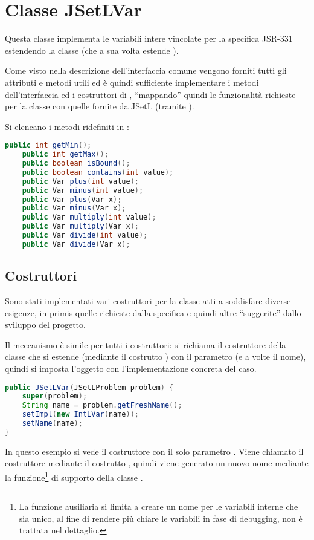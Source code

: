 \section{Classe JSetLVar}
Questa classe implementa le variabili intere vincolate
 per la specifica JSR-331
estendendo la classe  (che a sua volta estende 
).

Come visto nella descrizione dell'interfaccia comune vengono forniti tutti gli
attributi e metodi utili ed è quindi sufficiente implementare i metodi
dell'interfaccia  ed i costruttori di ,
``mappando'' quindi le funzionalità richieste per la classe 
con quelle fornite da JSetL (tramite ).

Si elencano i metodi ridefiniti in :
\begin{lstlisting}[language = Java,
                   frame = single,
                   caption = {Metodi di JSetLVar},
                   label = metodiVar]
        public int getMin();
	public int getMax(); 
	public boolean isBound();
	public boolean contains(int value);
	public Var plus(int value);
	public Var minus(int value);
	public Var plus(Var x);
	public Var minus(Var x); 
	public Var multiply(int value);
	public Var multiply(Var x);
	public Var divide(int value);
	public Var divide(Var x);
\end{lstlisting}

\subsection{Costruttori}
Sono stati implementati vari costruttori per la classe  atti
a soddisfare diverse esigenze, in primis quelle richieste dalla specifica e 
quindi altre ``suggerite'' dallo sviluppo del progetto.

Il meccanismo è simile per tutti i costruttori: si richiama il costruttore
della classe che si estende (mediante il costrutto ) con il
parametro  (e a volte il nome), quindi si imposta l'oggetto
 con l'implementazione concreta del caso.
 
\begin{lstlisting}[language = Java,
                   caption = {\files{Un costruttore di JSetLVar}.}]
public JSetLVar(JSetLProblem problem) {
	super(problem);
	String name = problem.getFreshName();
	setImpl(new IntLVar(name));
	setName(name);
}
\end{lstlisting}
In questo esempio si vede il costruttore con il solo parametro .
Viene chiamato il costruttore  mediante il
costrutto , quindi viene generato un nuovo nome mediante
la funzione\footnote{La funzione ausiliaria  si limita a
creare un nome per le variabili interne che sia unico, al fine di rendere più
chiare le variabili in fase di debugging, non è trattata nel dettaglio.} di 
supporto  della classe .


